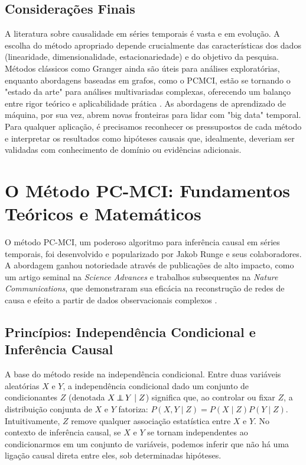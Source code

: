 \documentclass[12pt, a4paper]{article}
\newcommand{\indep}{\perp\kern-0.9em\perp}
\begin{document}
\subsection{Considerações Finais}
A literatura sobre causalidade em séries temporais é vasta e em evolução. A escolha do método apropriado depende crucialmente das características dos dados (linearidade, dimensionalidade, estacionariedade) e do objetivo da pesquisa. Métodos clássicos como Granger ainda são úteis para análises exploratórias, enquanto abordagens baseadas em grafos, como o PCMCI, estão se tornando o "estado da arte" para análises multivariadas complexas, oferecendo um balanço  entre rigor teórico e aplicabilidade prática \cite{runge2019}. As abordagens de aprendizado de máquina, por sua vez, abrem novas fronteiras para lidar com "big data" temporal. Para qualquer aplicação, é precisamos reconhecer os pressupostos de cada método e interpretar os resultados como hipóteses causais que, idealmente, deveriam ser validadas com conhecimento de domínio ou evidências adicionais.




\section{O Método PC-MCI: Fundamentos Teóricos e Matemáticos}

O método PC-MCI, um poderoso algoritmo para inferência causal em séries temporais, foi desenvolvido e popularizado por Jakob Runge e seus colaboradores. A abordagem ganhou notoriedade através de publicações de alto impacto, como um artigo seminal na \textit{Science Advances} e trabalhos subsequentes na \textit{Nature Communications}, que demonstraram sua eficácia na reconstrução de redes de causa e efeito a partir de dados observacionais complexos \cite{runge2019, runge2019natcom}.

\subsection*{Princípios: Independência Condicional e Inferência Causal}

A base do método reside na independência condicional. Entre duas variáveis aleatórias $X$ e $Y$, a independência condicional dado um conjunto de condicionantes $Z$ (denotada $X \indep Y \mid Z$) significa que, ao controlar ou fixar $Z$, a distribuição conjunta de $X$ e $Y$ fatoriza: $P(X, Y \mid Z) = P(X \mid Z) P(Y \mid Z)$. Intuitivamente, $Z$ remove qualquer associação estatística entre $X$ e $Y$. No contexto de inferência causal, se $X$ e $Y$ se tornam independentes ao condicionarmos em um conjunto de variáveis, podemos inferir que não há uma ligação causal direta entre eles, sob determinadas hipóteses.
\end{document}
